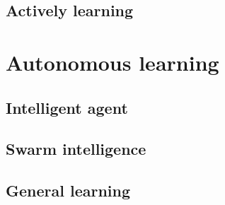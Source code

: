 \subsection{}\label{subsec:machine-learning}

\subsection{}\label{subsec:rl}

\subsection{Actively learning}\label{subsec:actively-learning}



\section{Autonomous learning}\label{sec:autonomous-learning}

\subsection{Intelligent agent}\label{subsec:intelligent-agent}

\subsection{}\label{subsec:mas}

\subsection{Swarm intelligence}\label{subsec:swarm-intelligence}


\subsection{General learning}\label{subsec:general-learning}

